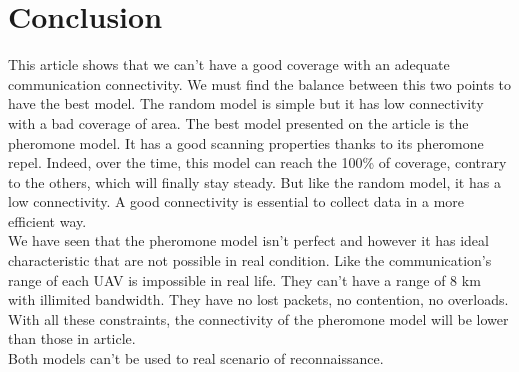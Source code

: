 \part{Conclusion}

This article shows that we can't have a good coverage with an adequate communication connectivity. We must find the balance between this two points to have the best model. The random model is simple but it has low connectivity with a bad coverage of area. The best model presented on the article is the pheromone model. It has a good scanning properties thanks to its pheromone repel. Indeed, over the time, this model can reach the 100\% of coverage, contrary to the others, which will finally stay steady. But like the random model, it has a low connectivity. A good connectivity is essential to collect data in a more efficient way.\\

We have seen that the pheromone model isn't perfect and however it has ideal characteristic that are not possible in real condition. Like the communication's range of each UAV is impossible in real life. They can't have a range of 8 km with illimited bandwidth. They have no lost packets,  no contention, no overloads. With all these constraints, the connectivity of the pheromone model will be lower than those in article.\\
Both models can't be used to real scenario of reconnaissance.